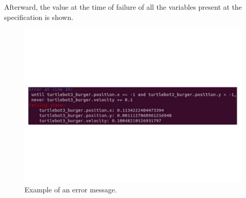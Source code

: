 Afterward, the value at the time of failure of all the variables present at the specification is shown.


\begin{figure}[h]
\includegraphics[width=\textwidth]{images/error_message.pdf}
\caption{Example of an error message.} \label{fig:monerror}
\end{figure}